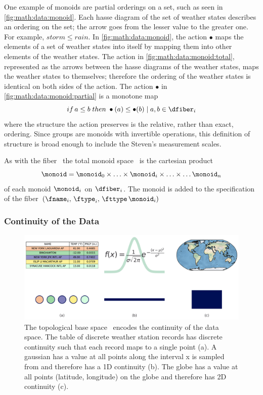 \documentclass[../main.tex]{subfiles}
\begin{document}
One example of monoids are partial orderings on a set, such as seen in \autoref{fig:math:data:monoid}. Each hasse diagram of the set of weather states describes an ordering on the set; the arrow goes from the lesser value to the greater one. For example, $storm \leq rain$. In \autoref{fig:math:data:monoid}, the action $\bullet$ maps the elements of a set of weather states into itself by mapping them into other elements of the weather states. The action in  \autoref{fig:math:data:monoid:total}, represented as the arrows between the hasse diagrams of the weather states, maps the weather states to themselves; therefore the ordering of the weather states is identical on both sides of the action. The action $\bullet$ in \autoref{fig:math:data:monoid:partial} is a monotone map\cite{fongInvitationAppliedCategory2019}
\begin{equation*}
    if\, a \leq b \; then \; \bullet(a) \leq \bullet(b) \mid a,b \in \dfiber_{i}
\end{equation*}
where the structure the action preserves is the relative, rather than exact, ordering. Since groups are monoids with invertible operations, this definition of structure is broad enough to include the Steven's measurement scales\cite{stevensTheoryScalesMeasurement1946,leaFormalizationMeasurementScale}.

As with the fiber \dfiber\, the total monoid space \monoid\ is the cartesian product
\begin{equation}
    \label{eq:math:data:monoid:decompose}
\monoid= \monoid_{0} \times \ldots \times \monoid_{i}\times \ldots \times\ldots \monoid_{n}
\end{equation}
of each monoid \(\monoid_{i}\) on \(\dfiber_{i}\).  The monoid is added to the specification of the fiber \((\fname_i,\, \ftype_i,\, \fttype\, \monoid_i)\)

\subsubsection{Continuity of the Data} 
\label{sec:math:data:base}
\begin{figure}[H]
    \includegraphics[width=1\textwidth]{figures/math/k_different_types.png}
    \caption{The topological base space \dbase\ encodes the continuity of the data space. The table of discrete weather station records has discrete continuity such that each record maps to a single point (a). A gaussian has a value at all points along the interval x is sampled from and therefore has a 1D continuity (b). The globe has a value at all points (latitude, longitude) on the globe and therefore has 2D continuity (c). }
    \label{fig:math:data:base:types}
\end{figure}
\end{document}
